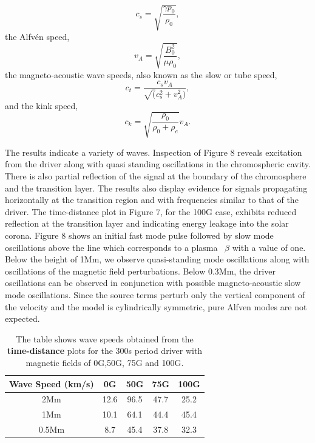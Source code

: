 \documentclass[physics,article,submit,pdftex,moreauthors]{Definitions/mdpi}
\begin{document}
\begin{equation}
 c_{s}  =    \sqrt{\frac{\gamma p_0}{\rho_0}}, 
\label{e10}
\end{equation}
the Alfvén speed,
\begin{equation}
 v_{A}  =    \sqrt{\frac{B_{0}^{2}}{\mu\rho_{0}}},  
\label{e11}
\end{equation}
the magneto-acoustic wave speeds, also known as  the slow or tube speed,
\begin{equation}
 c_{t}  =    \frac{c_s v_A}{\sqrt(c_s^2+v_A^2)}, 
\label{e12}
\end{equation}
and the kink speed,
\begin{equation}
 c_{k}  =    \sqrt{\frac{\rho_0}{\rho_0+\rho_e}}v_A.
\label{e12}
\end{equation}

The results indicate a variety of waves. Inspection of Figure 8 reveals excitation from the driver along with quasi standing oscillations in the chromospheric cavity. There is also partial reflection of the signal at the boundary of the chromosphere and the transition layer. The results also display evidence for signals propagating horizontally at the transition region and with frequencies similar to that of the driver. The time-distance plot in Figure 7, for the 100G case, exhibits reduced reflection at the transition layer and indicating energy leakage into the solar corona. Figure 8 shows an initial fast mode pulse followed by slow mode oscillations above the line which corresponds to a plasma ~$\beta$ with a value of one. Below the height of 1Mm, we observe quasi-standing mode oscillations along with oscillations of the magnetic field perturbations. Below 0.3Mm, the driver oscillations can be observed in conjunction with possible magneto-acoustic slow mode oscillations. Since the source terms perturb only the vertical component of the velocity and the model is cylindrically symmetric, pure Alfven modes are not expected.



\begin{table}\label{wavespeeds}
\centering
\begin{tabular}{c c c c c}
\hline
Wave Speed (km/s)   &  0G  &  50G &  75G & 100G\\
\hline
2Mm & 12.6  &   96.5       &   47.7      &  25.2     \\
\hline
1Mm & 10.1  &    64.1      &   44.4     &   45.4      \\
\hline
0.5Mm & 8.7  &   45.4      &   37.8      &   32.3    \\
\hline

\end{tabular} 
\caption{The table shows wave speeds obtained from the {\bf time-distance} plots for the 300s period driver with magnetic fields of 0G,50G, 75G and 100G.}
\label{Tablewavespeeds_300s}
\end{table}
\end{document}
